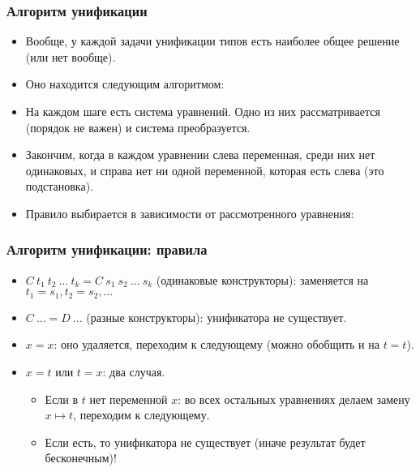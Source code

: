 \documentclass[11pt]{beamer}
\begin{document}
\begin{frame}[fragile]
\frametitle{Алгоритм унификации}
\begin{itemize}
    \item Вообще, у каждой задачи унификации типов есть наиболее общее решение (или нет вообще). 
    \item Оно находится следующим алгоритмом:
    \pause
    \item На каждом шаге есть система уравнений. Одно из них рассматривается (порядок не важен) и система преобразуется.
    \item Закончим, когда в каждом уравнении слева переменная, среди них нет одинаковых, и справа нет ни одной переменной, которая есть слева (это подстановка).
    \item Правило выбирается в зависимости от рассмотренного уравнения:
\end{itemize}
\end{frame}

\begin{frame}[fragile]
\frametitle{Алгоритм унификации: правила}
\begin{itemize}
    \item $C~t_1~t_2~\ldots~t_k = C~s_1~s_2~\ldots~s_k$ (одинаковые конструкторы): \pause заменяется на $t_1 = s_1, t_2 = s_2, \ldots$
    \pause
    \item $C~\ldots = D~\ldots$ (разные конструкторы): \pause унификатора не существует.
    \pause
    \item $x=x$: \pause оно удаляется, переходим к следующему (можно обобщить и на $t=t$).
    \pause
    \item $x=t$ или $t=x$: два случая. \pause
    \begin{itemize}
        \item Если в $t$ нет переменной $x$: \pause во всех остальных уравнениях делаем замену $x \mapsto t$, переходим к следующему.
        \item Если есть\pause, то унификатора не существует (иначе результат будет бесконечным)!
    \end{itemize}
\end{itemize}
\end{frame}
\end{document}
